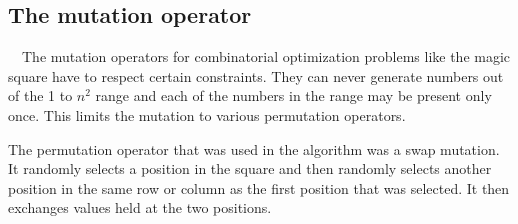 \subsection[The mutation operator]{\label{identificadorReferenciaCruzada}
The mutation operator}

\ \ The mutation operators for combinatorial optimization problems like the magic square have to respect certain constraints. They can never generate numbers out of the 1 to $n^2$ range and each of the numbers in the range may be present only once. This limits the mutation to various permutation operators.

The permutation operator that was used in the algorithm was a swap mutation. It randomly selects a position in the square and then randomly selects another position in the same row or column as the first position that was selected. It then exchanges values held at the two positions.
